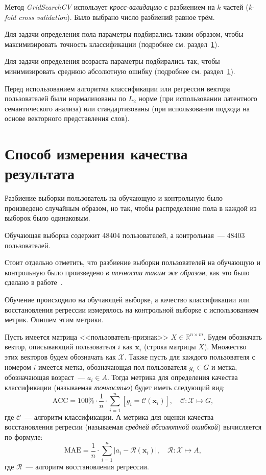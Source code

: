 Метод \textit{GridSearchCV} использует \textit{кросс-валидацию}
с разбиением на $k$ частей (\textit{k-fold cross validation}).
Было выбрано число разбиений равное трём.

Для задачи определения пола параметры подбирались таким
образом, чтобы максимизировать точность классификации (подробнее
см. раздел~\ref{sec:result_quality}).

Для задачи определения возраста параметры подбирались так, чтобы
минимизировать среднюю абсолютную ошибку (подробнее см.
раздел~\ref{sec:result_quality}).

Перед использованием алгоритма классификации или регрессии
вектора пользователей были нормализованы по $L_2$ норме
(при использовании латентного семантического анализа) или
стандартизованы (при использовании подхода на основе
векторного представления слов).

\section{Способ измерения качества результата}
\label{sec:result_quality}

Разбиение выборки пользователь на обучающую и контрольную
было произведено случайным образом, но так, чтобы распределение
пола в каждой из выборок было одинаковым.

Обучающая выборка содержит 48404 пользователей, а контрольная~---
48403 пользователей.

Стоит отдельно отметить, что разбиение выборки пользователей на
обучающую и контрольную было произведено \textit{в точности таким
же образом}, как это было сделано в работе~\cite{wu2014gender}.

Обучение происходило на обучающей выборке, а качество классификации
или восстановления регрессии измерялось на контрольной выборке
с использованием метрик. Опишем этим метрики. 

Пусть имеется матрица <<пользователь-признак>>
$X \in \mathbb{R}^{n \times m}$. Будем обозначать вектор,
описывающий пользователя $i$ как $\bm{x}_i$ (строка матрицы $X$).
Множество этих векторов будем обозначать как $\mathcal{X}$.
Также пусть для каждого пользователя с номером $i$ имеется метка,
обозначающая пол пользователя $g_i \in G$ и метка, обозначающая
возраст~--- $a_i \in A$. Тогда метрика для определения качества
классификации (называемая \textit{точностью}) будет иметь следующий вид:
\[
    \mathrm{ACC} = 
    100\% \cdot \frac{1}{n} \cdot 
    \sum_{i=1}^{n}[g_i = \mathcal{C}(\bm{x}_i)],
    \quad \mathcal{C} \colon \mathcal{X} \mapsto G,
\]
где $\mathcal{C}$~--- алгоритм классификации. А метрика для оценки
качества восстановления регресии (называемая \textit{средней
абсолютной ошибкой}) вычисляется по формуле:
\[
    \mathrm{MAE} =
    \frac{1}{n} \cdot \sum_{i=1}^{n} 
    \left|a_i - \mathcal{R}(\bm{x}_i)\right|,
    \quad \mathcal{R} \colon \mathcal{X} \mapsto A,
\]
где $\mathcal{R}$~--- алгоритм восстановления регрессии.

